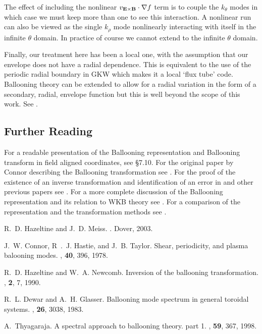 \documentclass[a4paper,11pt]{article}
\begin{document}
\begin{small}
The effect of including the nonlinear $v_{{\bf E} \times {\bf B}} \cdot \nabla f$ term is to couple the $k_\theta$ modes in which case we must keep more than one to see this interaction.  A nonlinear run can also be viewed as the single $k_\rho$ mode nonlinearly interacting with itself in the infinite $\theta$ domain.  In practice of course we cannot extend to the infinite $\theta$ domain.

Finally, our treatment here has been a local one, with the assumption that our envelope does not have a radial dependence.  This is equivalent to the use of the periodic radial boundary in GKW which makes it a local `flux tube' code.  Ballooning theory can be extended to allow for a radial variation in the form of a secondary, radial, envelope function but this is well beyond the scope of this work. See \cite{Dewar83}.

\end{small}



\setlength{\parskip}{4pt}
\begin{tiny}\section{Further Reading}

For a readable presentation of the Ballooning representation and Ballooning transform in field aligned coordinates, see \cite{H+M} \S 7.10.  For the original paper by Connor describing the Ballooning transformation see \cite{CHT}.  For the proof of the existence of an inverse transformation and identification of an error in \cite{CHT} and other previous papers see \cite{HazeltineNewcomb}.  For a more complete discussion of the Ballooning representation and its relation to WKB theory see \cite{Dewar83}.  For a comparison of the representation and the transformation methods see \cite{Thy}.

\begin{thebibliography}{5}

R.~D. Hazeltine and J.~D. Meiss.
.
\newblock Dover, 2003.

J.~W. Connor, R~.~J. Hastie, and J.~B. Taylor.
\newblock Shear, periodicity, and plasma balooning modes.
, {\bf 40}, 396, 1978.

R.~D. Hazeltine and W.~A. Newcomb.
\newblock Inversion of the ballooning transformation.
, {\bf 2}, 7, 1990.

R.~L. Dewar and A.~H. Glasser.
\newblock Ballooning mode spectrum in general toroidal systems.
, {\bf 26}, 3038, 1983.

A.~Thyagaraja.
\newblock A spectral approach to ballooning theory. part 1.
, {\bf 59}, 367, 1998.

\end{thebibliography}

\end{tiny}
\end{document}
